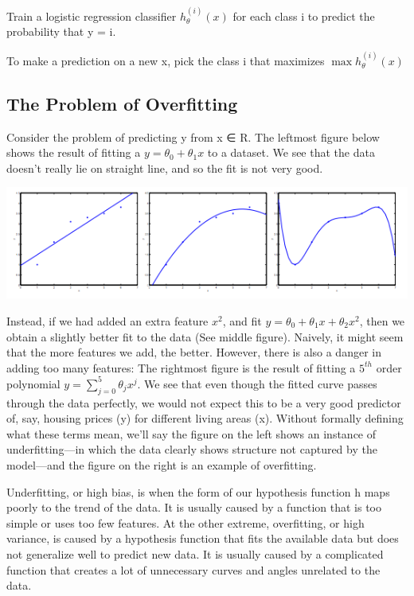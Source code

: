 \documentclass[
]{article}
\begin{document}
Train a logistic regression classifier \(h_\theta^{(i)}(x)\) for each
class i to predict the probability that y = i.

To make a prediction on a new x, pick the class i that maximizes
\(\max h_\theta^{(i)} (x)\)

\hypertarget{the-problem-of-overfitting}{%
\subsection{The Problem of
Overfitting}\label{the-problem-of-overfitting}}

Consider the problem of predicting y from x ∈ R. The leftmost figure
below shows the result of fitting a \(y = θ_0 + θ_1x\) to a dataset. We
see that the data doesn't really lie on straight line, and so the fit is
not very good.

\includegraphics{Overfitting.png}

Instead, if we had added an extra feature \(x^2\), and fit
\(y = \theta_0 + \theta_1x + \theta_2x^2\), then we obtain a slightly
better fit to the data (See middle figure). Naively, it might seem that
the more features we add, the better. However, there is also a danger in
adding too many features: The rightmost figure is the result of fitting
a \(5^{th}\) order polynomial \(y = \sum_{j=0} ^5 \theta_j x^j\). We see
that even though the fitted curve passes through the data perfectly, we
would not expect this to be a very good predictor of, say, housing
prices (y) for different living areas (x). Without formally defining
what these terms mean, we'll say the figure on the left shows an
instance of underfitting---in which the data clearly shows structure not
captured by the model---and the figure on the right is an example of
overfitting.

Underfitting, or high bias, is when the form of our hypothesis function
h maps poorly to the trend of the data. It is usually caused by a
function that is too simple or uses too few features. At the other
extreme, overfitting, or high variance, is caused by a hypothesis
function that fits the available data but does not generalize well to
predict new data. It is usually caused by a complicated function that
creates a lot of unnecessary curves and angles unrelated to the data.
\end{document}
